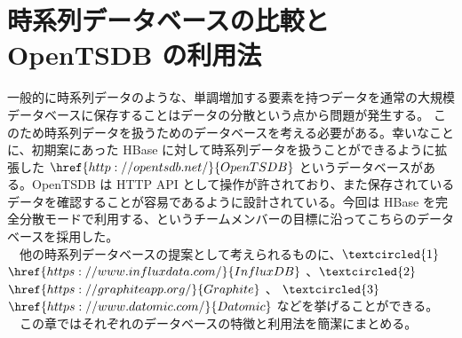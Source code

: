 \documentclass{scrartcl}
\begin{document}
\section{時系列データベースの比較と OpenTSDB の利用法}
\label{sec:org77fa48d}
一般的に時系列データのような、単調増加する要素を持つデータを通常の大規模データベースに保存することはデータの分散という点から問題が発生する。 \cite{hbase-reference} このため時系列データを扱うためのデータベースを考える必要がある。幸いなことに、初期案にあった HBase に対して時系列データを扱うことができるように拡張した \(\href{http://opentsdb.net/}{OpenTSDB}\) というデータベースがある。OpenTSDB は HTTP API として操作が許されており、また保存されているデータを確認することが容易であるように設計されている。今回は HBase を完全分散モードで利用する、というチームメンバーの目標に沿ってこちらのデータベースを採用した。\\
　他の時系列データベースの提案として考えられるものに、\(\textcircled{\scriptsize 1}\) \(\href{https://www.influxdata.com/}{InfluxDB}\) 、\(\textcircled{\scriptsize 2}\) \(\href{https://graphiteapp.org/}{Graphite}\) 、 \(\textcircled{\scriptsize 3}\) \(\href{https://www.datomic.com/}{Datomic}\) などを挙げることができる。\\
　この章ではそれぞれのデータベースの特徴と利用法を簡潔にまとめる。\\
\end{document}
